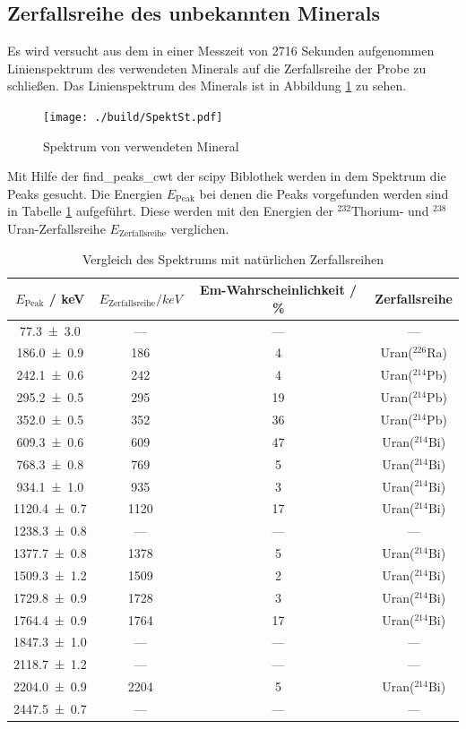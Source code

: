 \subsection{Zerfallsreihe des unbekannten Minerals}
Es wird versucht aus dem in einer Messzeit von 2716 Sekunden aufgenommen Linienspektrum des verwendeten Minerals auf die Zerfallsreihe der Probe zu schließen. Das Linienspektrum des Minerals ist in Abbildung \ref{fig:Stone} zu sehen.
\begin{figure}[h]
  \centering
  \texttt{[image: ./build/SpektSt.pdf]}
  \caption{Spektrum von verwendeten Mineral}
  \label{fig:Stone}
\end{figure}
Mit Hilfe der find\_peaks\_cwt der scipy Biblothek werden in dem Spektrum die Peaks gesucht. Die Energien $E_\text{Peak}$ bei denen die Peaks vorgefunden werden sind in Tabelle \ref{tab:Stone} aufgeführt. Diese werden mit den Energien der $^{232}$Thorium- und $^{238}$Uran-Zerfallsreihe $E_\text{Zerfallsreihe}$ verglichen.
\begin{table}
  \centering
  \caption{Vergleich des Spektrums mit natürlichen Zerfallsreihen}
  \begin{tabular}{c c c c}
    \toprule
    $E_\text{Peak}$ / keV & $E_\text{Zerfallsreihe} /keV$ & Em-Wahrscheinlichkeit / \% & Zerfallsreihe \\
    \midrule
    \num{77,3+-3,0}	& ---	& ---	& ---	\\
    \num{186,0+-0,9}	& 186	& 4	&Uran($^{226}$Ra)	\\
    \num{242,1+-0,6}	& 242	& 4	&Uran($^{214}$Pb)	\\
    \num{295,2+-0,5}	& 295	& 19	&Uran($^{214}$Pb)	\\
    \num{352,0+-0,5}	& 352	& 36	&Uran($^{214}$Pb)	\\
    \num{609,3+-0,6}	& 609	& 47	&Uran($^{214}$Bi)	\\
    \num{768,3+-0,8}	& 769	& 5	&Uran($^{214}$Bi)	\\
    \num{934,1+-1,0}	& 935	& 3	&Uran($^{214}$Bi)	\\
    \num{1120,4+-0,7}	& 1120	& 17	&Uran($^{214}$Bi)	\\
    \num{1238,3+-0,8}	& ---	& ---	& ---	\\
    \num{1377,7+-0,8}	& 1378	& 5	&Uran($^{214}$Bi)	\\
    \num{1509,3+-1,2}	& 1509	& 2	&Uran($^{214}$Bi)	\\
    \num{1729,8+-0,9}	& 1728	& 3	&Uran($^{214}$Bi)	\\
    \num{1764,4+-0,9}	& 1764	& 17	&Uran($^{214}$Bi)	\\
    \num{1847,3+-1,0}	& ---	& ---	& ---	\\
    \num{2118,7+-1,2}	& ---	& ---	& ---	\\
    \num{2204,0+-0,9}	& 2204	& 5  	&Uran($^{214}$Bi)	\\
    \num{2447,5+-0,7}	& ---	& ---	& ---	\\
    \bottomrule
  \end{tabular}
  \label{tab:Stone}
\end{table}
